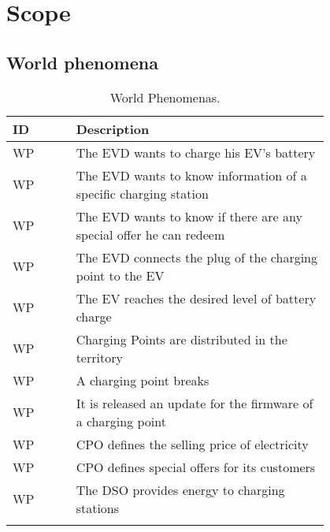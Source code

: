 \section{Scope}
\label{sec:scope}%

\subsection{World phenomena}
\label{subsec:world_phenomena}%
\setcounter{wp}{1}
\newcommand{\cwp}{\thewp\stepcounter{wp}}
\begin{center}
    \begin{longtable}{ |l|p{0.8\linewidth}| }
        \hline
        \textbf{ID} & \textbf{Description}                                               \\
        \hline
        WP\cwp      & The EVD wants to charge his EV's battery                           \\
        \hline
        WP\cwp      & The EVD wants to know information of a specific charging station   \\
        \hline
        WP\cwp      & The EVD wants to know if there are any special offer he can redeem \\
        \hline
        WP\cwp      & The EVD connects the plug of the charging point to the EV          \\
        \hline
        WP\cwp      & The EV reaches the desired level of battery charge                 \\
        \hline
        WP\cwp      & Charging Points are distributed in the territory                   \\
        \hline
        WP\cwp      & A charging point breaks                                            \\
        \hline
        WP\cwp      & It is released an update for the firmware of a charging point      \\
        \hline
        WP\cwp      & CPO defines the selling price of electricity                       \\
        \hline
        WP\cwp      & CPO defines special offers for its customers                       \\
        \hline
        WP\cwp      & The DSO provides energy to charging stations                       \\
        \hline
        \caption{World Phenomenas.}
        \label{tab:worldph_tab}%
    \end{longtable}
\end{center}

